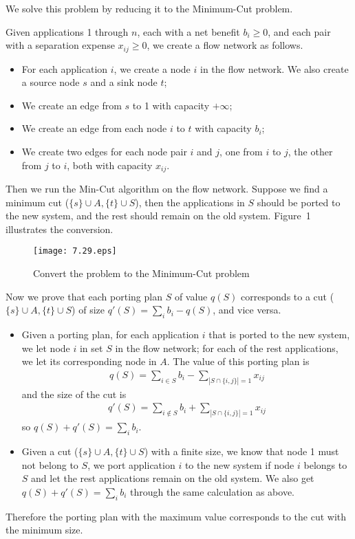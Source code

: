 \documentclass[12pt,letterpaper]{article}
\begin{document}
We solve this problem by reducing it to the Minimum-Cut problem.

Given applications 1 through $n$, each with a net benefit $b_i \ge 0$, and each pair with a separation expense $x_{ij} \ge 0$, we create a flow network as follows.
\begin{itemize}
\item For each application $i$, we create a node $i$ in the flow network. We also create a source node $s$ and a sink node $t$;
\item We create an edge from $s$ to 1 with capacity $+\infty$;
\item We create an edge from each node $i$ to $t$ with capacity $b_i$;
\item We create two edges for each node pair $i$ and $j$, one from $i$ to $j$, the other from $j$ to $i$, both with capacity $x_{ij}$.
\end{itemize}

Then we run the Min-Cut algorithm on the flow network. Suppose we find a minimum cut ($\{s\}\cup A, \{t\}\cup S$), then the applications in $S$ should be ported to the new system, and the rest should remain on the old system. Figure~1 illustrates the conversion.
\begin{figure}
\begin{center}
\texttt{[image: 7.29.eps]}
\caption{Convert the problem to the Minimum-Cut problem}
\end{center}
\end{figure}

Now we prove that each porting plan $S$ of value $q(S)$ corresponds to a cut ($\{s\}\cup A, \{t\}\cup S$) of size $q'(S)=\sum_i b_i-q(S)$, and vice versa.
\begin{itemize}
\item Given a porting plan, for each application $i$ that is ported to the new system, we let node $i$ in set $S$ in the flow network; for each of the rest applications, we let its corresponding node in $A$. The value of this porting plan is 
\begin{align}
q(S)=\sum_{i\in S}b_i-\sum_{|S\cap \{i,j\}|=1}x_{ij}
\end{align}
and the size of the cut is 
\begin{align}
q'(S)=\sum_{i\notin S}b_i+\sum_{|S\cap \{i,j\}|=1}x_{ij}
\end{align}
so $q(S)+q'(S)=\sum_i b_i$.
\item Given a cut ($\{s\}\cup A, \{t\}\cup S$) with a finite size, we know that node 1 must not belong to $S$, we port application $i$ to the new system if node $i$ belongs to $S$ and let the rest applications remain on the old system. We also get $q(S)+q'(S)=\sum_i b_i$ through the same calculation as above.
\end{itemize}
Therefore the porting plan with the maximum value corresponds to the cut with the minimum size.
\end{document}
